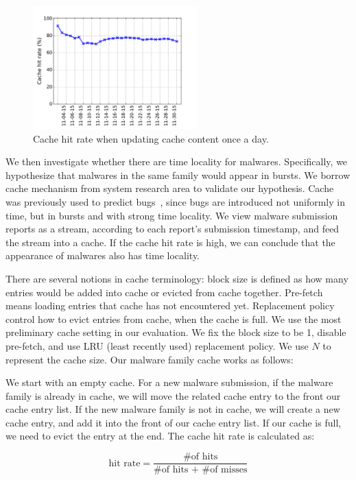 \begin{figure}[t!]
\begin{center}
\includegraphics[width=2.5in]{figure/LRU_day}
\caption{Cache hit rate when updating cache content once a day.}
\label{fig:batchcache}
\end{center}
\end{figure}

We then investigate whether there are time locality for malwares.
Specifically, we hypothesize that malwares in the same family would appear in bursts.  
We borrow cache mechanism from system research area to validate our hypothesis. 
Cache was previously used to predict bugs~\cite{predicting}, 
since bugs are introduced not uniformly in time, but in bursts and with strong time locality. 
We view malware submission reports as a stream, 
according to each report’s submission timestamp, and feed the stream into a cache. 
If the cache hit rate is high, 
we can conclude that the appearance of malwares also has time locality. 

There are several notions in cache terminology: 
block size is defined as how many entries would be added into cache or evicted from cache together.
Pre-fetch means loading entries that cache has not encountered yet. 
Replacement policy control how to evict entries from cache, when the cache is full. 
We use the most preliminary cache setting in our evaluation. We fix the block size to be 1, disable pre-fetch, 
and use LRU (least recently used) replacement policy. We use $N$ to represent the cache size.
Our malware family cache works as follows:  

We start with an empty cache. 
For a new malware submission, if the malware family is already in cache, 
we will move the related cache entry to the front our cache entry list. 
If the new malware family is not in cache, 
we will create a new cache entry, and add it into the front of our cache entry list. 
If our cache is full, we need to evict the entry at the end. 
The cache hit rate is calculated as: 

$$ \mbox{hit rate} = \dfrac{\mbox{\# of hits}}{\mbox{\# of hits + \# of misses}}$$



